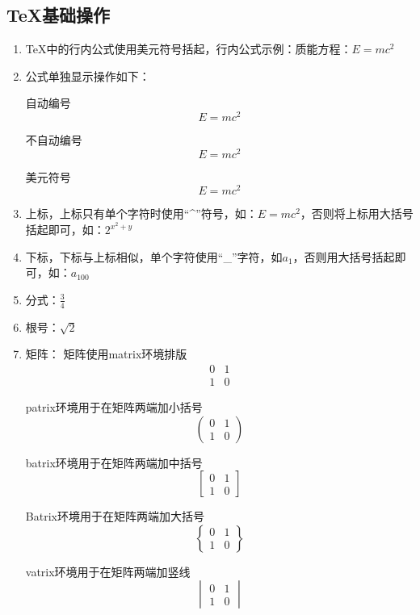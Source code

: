 \subsection{TeX{}基础操作}
\begin{enumerate}
	\item TeX{}中的行内公式使用美元符号括起，行内公式示例：质能方程：$E=mc^2$
	\item 公式单独显示操作如下：
	
	
	自动编号
	\begin{equation}
		E=mc^2
	\end{equation}
	
	
	不自动编号
	\begin{equation*}
		E=mc^2
	\end{equation*}
	
	
	
	美元符号
	$$E=mc^2$$
	\item 上标，上标只有单个字符时使用“\^{}”符号，如：$E=mc^2$，否则将上标用大括号括起即可，如：$2^{x^{2}+y}$
	\item 下标，下标与上标相似，单个字符使用“\_{}”字符，如$a_1$，否则用大括号括起即可，如：$a_{100}$
	\item 分式：$\frac{3}{4}$
	\item 根号：$\sqrt{2}$
	\item 矩阵： 矩阵使用matrix环境排版
	$$\begin{matrix}
		0 & 1 \\
		1 & 0
	\end{matrix}$$
	
	
	patrix环境用于在矩阵两端加小括号
	$$\begin{pmatrix}
		0 & 1 \\
		1 & 0
	\end{pmatrix}$$
	
	
	batrix环境用于在矩阵两端加中括号
	\begin{equation*}
		\begin{bmatrix}
			0 & 1 \\
			1 & 0
		\end{bmatrix}
	\end{equation*}
	
	Batrix环境用于在矩阵两端加大括号
	\begin{equation*}
		\begin{Bmatrix}
			0 & 1 \\
			1 & 0
		\end{Bmatrix}
	\end{equation*}
	
	vatrix环境用于在矩阵两端加竖线
	\begin{equation*}
		\begin{vmatrix}
			0 & 1 \\
			1 & 0
		\end{vmatrix}
	\end{equation*}
	

\end{enumerate}
